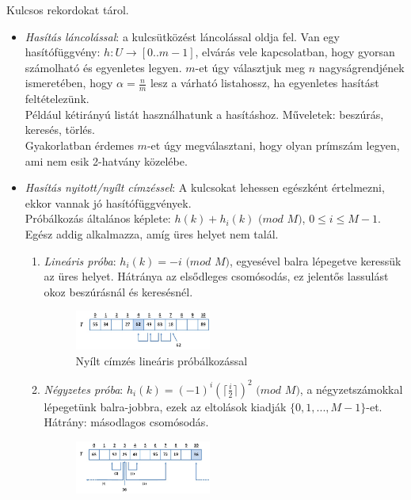 \documentclass[12pt,margin=0px]{article}
\begin{document}
	Kulcsos rekordokat tárol.
	\begin{itemize}
		\item \textit{Hasítás láncolással}: a kulcsütközést láncolással oldja fel. Van egy hasítófüggvény: $h: U \to [0..m-1]$, elvárás vele kapcsolatban, hogy gyorsan számolható és egyenletes legyen. $m$-et úgy választjuk meg $n$ nagyságrendjének ismeretében, hogy $\alpha = \frac{n}{m}$ lesz a várható listahossz, ha egyenletes hasítást feltételezünk.\\
		Például kétirányú listát használhatunk a hasításhoz. Műveletek: beszúrás, keresés, törlés. \\
		Gyakorlatban érdemes $m$-et úgy megválasztani, hogy olyan prímszám legyen, ami nem esik 2-hatvány közelébe.
		\item \textit{Hasítás nyitott/nyílt címzéssel}: A kulcsokat lehessen egészként értelmezni, ekkor vannak jó hasítófüggvények. \\
		Próbálkozás általános képlete: $h(k) + h_i(k)$ $(mod$ $M)$, $0 \leq i \leq M-1$. Egész addig alkalmazza, amíg üres helyet nem talál.
		\begin{enumerate}
			\item \textit{Lineáris próba}: $h_i(k) = -i$ $(mod$ $M)$, egyesével balra lépegetve keressük az üres helyet. Hátránya az elsődleges csomósodás, ez jelentős lassulást okoz beszúrásnál és keresésnél.
        	\begin{figure}[H]
    		\centering
	       	\includegraphics[width=0.45\textwidth]{img/hash_opentest.png}
		      \caption{Nyílt címzés lineáris próbálkozással}
	        \end{figure}
			\item \textit{Négyzetes próba}: $h_i(k) = (-1)^i(\lceil\frac{i}{2}\rceil)^2$ $(mod$ $M)$, a négyzetszámokkal lépegetünk balra-jobbra, ezek az eltolások kiadják $\{0,1,...,M-1\}$-et. Hátrány: másodlagos csomósodás.
        	\begin{figure}[H]
    		\centering
	       	\includegraphics[width=0.45\textwidth]{img/hash_squaretest.png}

\end{figure}
\end{enumerate}
\end{itemize}
\end{document}
